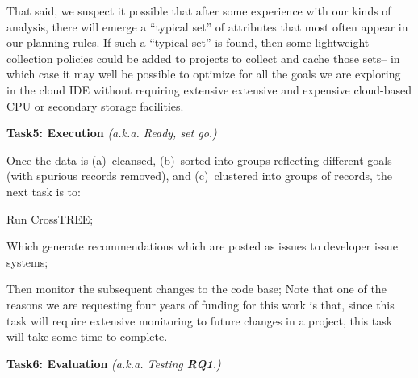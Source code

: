 That said, we suspect it possible that after some experience with
our kinds of analysis, there will emerge a ``typical set'' of attributes that most often appear in our
planning rules. If such a ``typical set'' is found, then some lightweight collection policies
could be added to projects to collect and cache those sets-- in which case it may well be possible
to optimize for all the goals we are exploring in the cloud IDE without requiring extensive
extensive and expensive cloud-based CPU or secondary storage facilities.

\noindent
{\bf Task5: Execution} {\em  (a.k.a. Ready, set go.)}

Once the data is (a)~cleansed, (b)~sorted into groups reflecting different goals (with spurious records removed), and 
(c)~clustered into groups of records, the next task is to:
\bi
\item
Run CrossTREE;
\item
Which generate recommendations which are posted as issues to developer issue systems;
\item
Then monitor the subsequent changes to the code base;
\ei
Note that one of the reasons we are requesting four years of funding for this work is that, since this task will require
extensive monitoring to future changes in a project, this task will take some
time to complete.

\noindent
{\bf Task6: Evaluation } {\em (a.k.a. Testing {\bf RQ1}.)}

